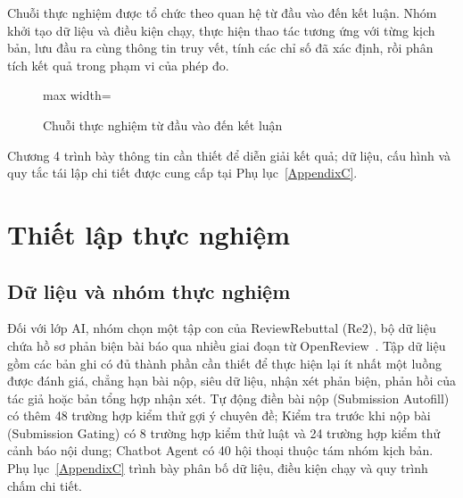 Chuỗi thực nghiệm được tổ chức theo quan hệ từ đầu vào đến kết luận. Nhóm khởi tạo dữ liệu và điều kiện chạy, thực hiện thao tác tương ứng với từng kịch bản, lưu đầu ra cùng thông tin truy vết, tính các chỉ số đã xác định, rồi phân tích kết quả trong phạm vi của phép đo.

\begin{figure}[H]
  \centering
  \begin{adjustbox}{max width=\textwidth}
  \end{adjustbox}
  \caption{Chuỗi thực nghiệm từ đầu vào đến kết luận}
  \label{fig:ch4-evaluation-chain}
\end{figure}

Chương 4 trình bày thông tin cần thiết để diễn giải kết quả; dữ liệu, cấu hình và quy tắc tái lập chi tiết được cung cấp tại Phụ lục~\ref{AppendixC}.

\section{Thiết lập thực nghiệm}

\subsection{Dữ liệu và nhóm thực nghiệm}

Đối với lớp AI, nhóm chọn một tập con của ReviewRebuttal (Re2), bộ dữ liệu chứa hồ sơ phản biện bài báo qua nhiều giai đoạn từ OpenReview~\cite{ch4ref1}. Tập dữ liệu gồm các bản ghi có đủ thành phần cần thiết để thực hiện lại ít nhất một luồng được đánh giá, chẳng hạn bài nộp, siêu dữ liệu, nhận xét phản biện, phản hồi của tác giả hoặc bản tổng hợp nhận xét. Tự động điền bài nộp (Submission Autofill) có thêm 48 trường hợp kiểm thử gợi ý chuyên đề; Kiểm tra trước khi nộp bài (Submission Gating) có 8 trường hợp kiểm thử luật và 24 trường hợp kiểm thử cảnh báo nội dung; Chatbot Agent có 40 hội thoại thuộc tám nhóm kịch bản. Phụ lục~\ref{AppendixC} trình bày phân bố dữ liệu, điều kiện chạy và quy trình chấm chi tiết.

